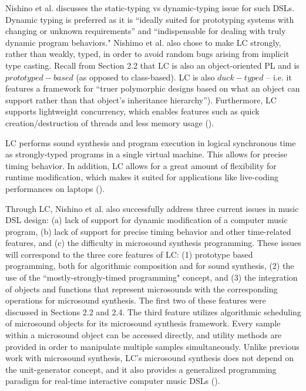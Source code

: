 \documentclass{report}
\newcommand\citeparen[1]{(\cite{#1})}
\begin{document}
Nishino et al. discusses the static-typing vs dynamic-typing issue for such DSLs. Dynamic typing is preferred as it is ``ideally suited for prototyping systems with changing or unknown requirements” and ``indispensable for dealing with truly dynamic program behaviors." Nishimo et al. also chose to make LC strongly,  rather than  weakly, typed, in order to avoid random  bugs arising from  implicit type casting. Recall  from Section 2.2 that LC is also an object-oriented PL and is $prototyped-based$ (as opposed  to  class-based). LC  is also $duck-typed$ -- i.e. it features a framework for  ``truer polymorphic designs based on what an object can support rather than that object’s inheritance hierarchy”). Furthermore,  LC supports lightweight concurrency, which enables features  such as  quick creation/destruction of threads and less memory usage \citeparen{nishino_osaka_nakatsu_2013}.

LC performs sound synthesis and program execution in logical synchronous time as strongly-typed programs in a single virtual machine. This allows for precise timing behavior. In  addition, LC allows for a great amount  of flexibility for  runtime modification, which makes it suited for applications  like live-coding performances on laptops \citeparen{nishino_osaka_nakatsu_2013}.

Through LC, Nishino et al. also successfully address three current issues in music DSL design: (a) lack of support for  dynamic modification of a computer music program, (b) lack of  support  for  precise  timing behavior and other time-related features, and (c) the difficulty in microsound synthesis  programming. These  issues  will correspond to the three core features of  LC: (1) prototype based programming, both for algorithmic composition and for sound synthesis, (2) the use of the ``mostly-strongly-timed programming" concept, and  (3)  the integration of objects and  functions that represent microsounds  with the corresponding operations for microsound synthesis. The  first two of these features were discussed in Sections 2.2 and 2.4. The third feature utilizes algorithmic scheduling of microsound objects for  its microsound synthesis framework. Every sample within a  microsound  object can  be  accessed  directly, and utility methods are provided in order to manipulate   multiple samples simultaneously. Unlike  previous work with microsound synthesis, LC's microsound synthesis does not depend on the unit-generator concept, and  it  also provides a generalized programming paradigm for real-time interactive computer music DSLs \citeparen{nishino_osaka_nakatsu_2014}.
\end{document}
